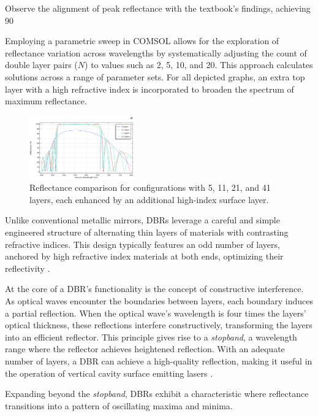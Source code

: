 Observe the alignment of peak reflectance with the textbook's findings, achieving 90%

Employing a parametric sweep in COMSOL allows for the exploration of reflectance variation across wavelengths by systematically adjusting the count of double layer pairs ($N$) to values such as 2, 5, 10, and 20. This approach calculates solutions across a range of parameter sets. For all depicted graphs, an extra top layer with a high refractive index is incorporated to broaden the spectrum of maximum reflectance.

\begin{figure}[ht!]
  \centering
  \includegraphics[width=0.4\textwidth]{Chapters/Figures/Chapter 4 Figures/High-Reflectance (5, 11, 21, and 41 Layers).png}
  \caption{Reflectance comparison for configurations with 5, 11, 21, and 41 layers, each enhanced by an additional high-index surface layer.}
  \label{fig:COMSOL multi-layer reflectance results}
\end{figure}

Unlike conventional metallic mirrors, DBRs leverage a careful and simple engineered structure of alternating thin layers of materials with contrasting refractive indices. This design typically features an odd number of layers, anchored by high refractive index materials at both ends, optimizing their reflectivity \cite{multiphysics__distributed_nodate}.

At the core of a DBR's functionality is the concept of constructive interference. As optical waves encounter the boundaries between layers, each boundary induces a partial reflection. When the optical wave's wavelength is four times the layers' optical thickness, these reflections interfere constructively, transforming the layers into an efficient reflector. This principle gives rise to a \emph{stopband}, a wavelength range where the reflector achieves heightened reflection. With an adequate number of layers, a DBR can achieve a high-quality reflection, making it useful in the operation of vertical cavity surface emitting lasers \cite{multiphysics__distributed_nodate}.

Expanding beyond the \emph{stopband}, DBRs exhibit a characteristic where reflectance transitions into a pattern of oscillating maxima and minima.

